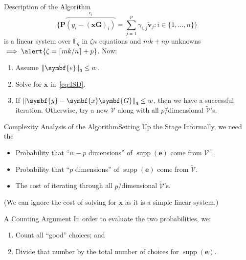 \documentclass[usepdftitle=false]{beamer}
\renewcommand*{\vec}{\symbf}
\newcommand*{\mat}{\symbf}
\DeclareMathOperator{\supp}{supp}
\newcommand*{\FF}{\ensuremath{\mathbb{F}}}
\DeclarePairedDelimiter{\ceil}{\lceil}{\rceil}
\DeclarePairedDelimiter{\norm}{\lVert}{\rVert}
\newcommand*{\normR}[2]{\ensuremath{\norm{#1}_{#2}}}
\begin{document}
\begin{frame}{Description of the Algorithm}
  \begin{equation}\label{eq:ISD}
    \{\mat{P} \overbrace{(y_i - {(\vec{x} \mat{G})}_i)}^{e_i} = \sum_{j
      = 1}^p \gamma_{i, j} \tilde{\vec{v}}_j : i \in \{1, \ldots,
    n\}\}
  \end{equation}
  is a linear system over \(\FF_q\) in \(\zeta n\) equations and
  \(m k + n p\) unknowns
  \(\implies \alert{\zeta = \ceil{m k / {n}} + p}\).  Now:
  \begin{enumerate}
  \item Assume \(\normR{\vec{e}}{q} \le w\).
  \item Solve for \(\vec{x}\) in~\eqref{eq:ISD}.
  \item If \(\normR{\vec{y} - \vec{x} \mat{G}}{q} \le w\), then we
    have a successful iteration.  Otherwise, try a new \(\mathcal{V}\)
    along with all \(p\)\=/dimensional \(\tilde{\mathcal{V}}\)'s.
  \end{enumerate}
\end{frame}

\begin{frame}{Complexity Analysis of the Algorithm}{Setting Up the Stage}
  Informally, we need the
  \begin{itemize}
  \item Probability that \enquote{\(w - p\) dimensions} of
    \(\supp(\vec{e})\) come from \(\mathcal{V}^{\perp}\).
  \item Probability that \enquote{\(p\) dimensions} of
    \(\supp(\vec{e})\) come from \(\tilde{\mathcal{V}}\).
  \item The cost of iterating through all \(p\)\=/dimensional
    \(\tilde{\mathcal{V}}\)'s.
  \end{itemize}
  (We can ignore the cost of solving for \(\vec{x}\) as it is a simple
  linear system.)
  \begin{alertblock}{A Counting Argument}
    In order to evaluate the two probabilities, we:
    \begin{enumerate}
    \item Count all \enquote{good} choices; and
    \item Divide that number by the total number of choices for
      \(\supp(\vec{e})\).
    \end{enumerate}
  \end{alertblock}
\end{frame}
\end{document}

